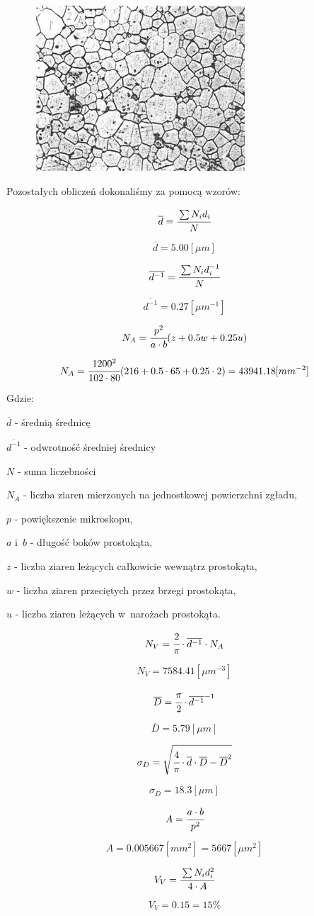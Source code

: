 \documentclass[a4paper,12pt]{article}
\begin{document}
\begin{figure}[H]
    \centering
    \includegraphics[width=0.7\textwidth]{img/wielkosc.png}
\end{figure}





{\color{purple}
Pozostałych obliczeń dokonaliśmy za pomocą wzorów:

$$\overline{d}=\cfrac{\sum N_id_i}{N}$$

$$\overline{d}=5.00[\mu m]$$

$$\overline{d^{-1}}=\cfrac{\sum N_id_i^{-1}}{N}$$

$$\overline{d^{-1}}=0.27[\mu m^{-1}]$$

$$N_A=\cfrac{p^2}{a\cdot b}(z+0.5w+0.25u)$$

$$N_A=\cfrac{1200^2}{102\cdot 80}(216+0.5\cdot 65+0.25\cdot 2)=43941.18[mm^{-2}]$$
}

Gdzie:

$\overline{d}$ - średnią średnicę

$\overline{d^{-1}}$ - odwrotność średniej średnicy

$N$ - suma liczebności

$N_A$ - liczba ziaren mierzonych na jednostkowej powierzchni zgładu,

$p$ - powiększenie mikroskopu,

$a$ i~$b$ - długość boków prostokąta,

$z$ - liczba ziaren leżących całkowicie wewnątrz prostokąta,

$w$ - liczba ziaren przeciętych przez brzegi prostokąta,

$u$ - liczba ziaren leżących w~narożach prostokąta.
\newpage

{\color{purple}
$$N_V=\cfrac{2}{\pi}\cdot \overline{d^{-1}} \cdot N_A$$

$$N_V=7584.41[\mu m^{-3}]$$

$$\overline{D}=\cfrac{\pi}{2}\cdot \overline{d^{-1}}^{-1}$$

$$\overline{D}=5.79[\mu m]$$

$$\sigma_D=\sqrt{\cfrac{4}{\pi}\cdot \overline{d}\cdot \overline{D} - \overline{D}^2}$$

$$\sigma_D=18.3 [\mu m]$$

$$A=\cfrac{a\cdot b}{p^2}$$

$$A=0.005667[mm^2]=5667[\mu m^2]$$

$$V_V=\cfrac{\sum N_id_i^2}{4\cdot A}$$

$$V_V=0.15=15\%$$
}
\end{document}
